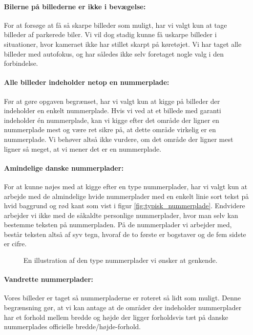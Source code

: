 \paragraph{Bilerne på billederne er ikke i bevægelse:}
For at forsøge at få så skarpe billeder som muligt, har vi valgt kun at tage billeder af parkerede biler. Vi vil dog stadig kunne få uskarpe billeder i situationer, hvor kameraet ikke har stillet skarpt på køretøjet. Vi har taget alle billeder med autofokus, og har således ikke selv foretaget nogle valg i den forbindelse.

\paragraph{Alle billeder indeholder netop en nummerplade:}
Før at gøre opgaven begrænset, har vi valgt kun at kigge på billeder der indeholder en enkelt nummerplade. Hvis vi ved at et billede med garanti indeholder én nummerplade, kan vi kigge efter det område der ligner en nummerplade mest og være ret sikre på, at dette område virkelig er en nummerplade. Vi behøver altså ikke vurdere, om det område der ligner mest ligner så meget, at vi mener det er en nummerplade.

\paragraph{Amindelige danske nummerplader:}
For at kunne nøjes med at kigge efter en type nummerplader, har vi valgt kun at arbejde med de almindelige hvide nummerplader med en enkelt linie sort tekst på hvid baggrund og rød kant som vist i figur \vref{fig:typisk_nummerplade}. Endvidere arbejder vi ikke med de såkaldte personlige nummerplader, hvor man selv kan bestemme teksten på nummerpladen. På de nummerplader vi arbejder med, består teksten altså af syv tegn, hvoraf de to første er bogstaver og de fem sidste er cifre.

\begin{figure}[htp]
\centering
{} 
\caption{En illustration af den type nummerplader vi ønsker at genkende.}
\label{fig:typisk_nummerplade}
\end{figure}

\paragraph{Vandrette nummerplader:}
Vores billeder er taget så nummerpladerne er roteret så lidt som muligt. Denne begrænsning gør, at vi kan antage at de områder der indeholder nummerplader har et forhold mellem bredde og højde der ligger forholdsvis tæt på danske nummerplades officielle bredde/højde-forhold.

